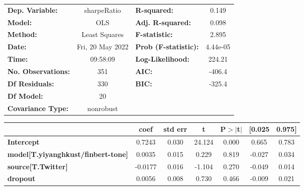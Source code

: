 \begin{center}
\begin{tabular}{lclc}
\toprule
\textbf{Dep. Variable:}                    &   sharpeRatio    & \textbf{  R-squared:         } &     0.149   \\
\textbf{Model:}                            &       OLS        & \textbf{  Adj. R-squared:    } &     0.098   \\
\textbf{Method:}                           &  Least Squares   & \textbf{  F-statistic:       } &     2.895   \\
\textbf{Date:}                             & Fri, 20 May 2022 & \textbf{  Prob (F-statistic):} &  4.44e-05   \\
\textbf{Time:}                             &     09:58:09     & \textbf{  Log-Likelihood:    } &    224.21   \\
\textbf{No. Observations:}                 &         351      & \textbf{  AIC:               } &    -406.4   \\
\textbf{Df Residuals:}                     &         330      & \textbf{  BIC:               } &    -325.4   \\
\textbf{Df Model:}                         &          20      & \textbf{                     } &             \\
\textbf{Covariance Type:}                  &    nonrobust     & \textbf{                     } &             \\
\bottomrule
\end{tabular}
\begin{tabular}{lcccccc}
                                           & \textbf{coef} & \textbf{std err} & \textbf{t} & \textbf{P$> |$t$|$} & \textbf{[0.025} & \textbf{0.975]}  \\
\midrule
\textbf{Intercept}                         &       0.7243  &        0.030     &    24.124  &         0.000        &        0.665    &        0.783     \\
\textbf{model[T.yiyanghkust/finbert-tone]} &       0.0035  &        0.015     &     0.229  &         0.819        &       -0.027    &        0.034     \\
\textbf{source[T.Twitter]}                 &      -0.0177  &        0.016     &    -1.104  &         0.270        &       -0.049    &        0.014     \\
\textbf{dropout}                           &       0.0056  &        0.008     &     0.730  &         0.466        &       -0.009    &        0.021     \\

\end{tabular}
\end{center}
